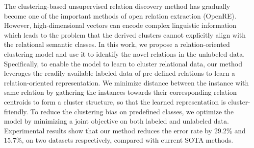 The clustering-based unsupervised relation discovery method has gradually become one of the important methods of open relation extraction (OpenRE). However, high-dimensional vectors can encode complex linguistic information which leads to the problem that the derived clusters cannot explicitly align with the relational semantic classes. In this work, we propose a relation-oriented clustering model and use it to identify the novel relations in the unlabeled data. Specifically, to enable the model to learn to cluster relational data, our method leverages the readily available labeled data of pre-defined relations to learn a relation-oriented representation. We minimize distance between the instance with same relation by gathering the instances towards their corresponding relation centroids to form a cluster structure, so that the learned representation is cluster-friendly. To reduce the clustering bias on predefined classes, we optimize the model by minimizing a joint objective on both labeled and unlabeled data. Experimental results show that our method reduces the error rate by 29.2\% and 15.7\%, on two datasets respectively, compared with current SOTA methods.
